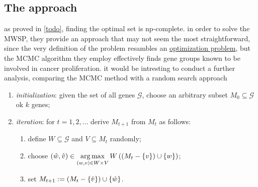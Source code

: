 

\subsection{The approach}

as proved in \cref{todo}, finding the optimal set is np-complete. in order to solve the MWSP, they provide an approach that may not seem the most straightforward, since the very definition of the problem resambles an \href{https://en.wikipedia.org/wiki/Optimization_problem}{optimization problem}, but the MCMC algorithm they employ effectively finds gene groups known to be involved in cancer proliferation. it would be intresting to conduct a further analysis, comparing the MCMC method with a random search approach

\begin{enumerate}
    \item \textit{initialization}: given the set of all genes $\mathcal G$, choose an arbitrary subset $M_0 \subseteq \mathcal G$ ok $k$ genes;
    \item \textit{iteration}: for $t = 1, 2, \ldots$ derive $M_{t + 1}$ from $M_t$ as follows:

    \begin{enumerate}
        \item define $W \subseteq \mathcal G$ and $V \subseteq M_t$ randomly;
        \item choose $\displaystyle (\hat w, \hat v) \in \operatorname*{arg\,max}_{(w, v) \in W \times V}{W\left(\left(M_t - \{v\}\right) \cup \{w\}\right)}$;
        \item set $M_{t + 1} := \left(M_t - \{\hat v\}\right) \cup \{\hat w\}$.
    \end{enumerate}
\end{enumerate}

